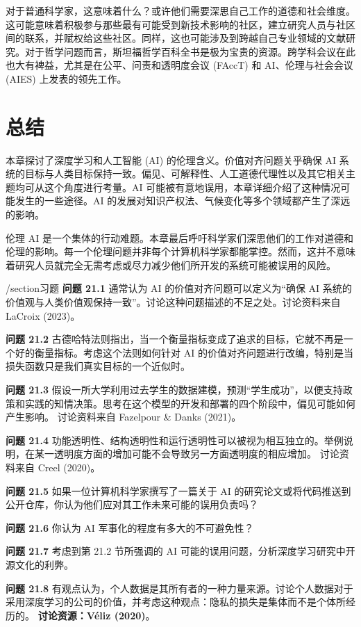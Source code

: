 对于普通科学家，这意味着什么？或许他们需要深思自己工作的道德和社会维度。这可能意味着积极参与那些最有可能受到新技术影响的社区，建立研究人员与社区间的联系，并赋权给这些社区。同样，这也可能涉及到跨越自己专业领域的文献研究。对于哲学问题而言，斯坦福哲学百科全书是极为宝贵的资源。跨学科会议在此也大有裨益，尤其是在公平、问责和透明度会议 (FAccT) 和 AI、伦理与社会会议 (AIES) 上发表的领先工作。

\section{总结}
本章探讨了深度学习和人工智能 (AI) 的伦理含义。价值对齐问题关乎确保 AI 系统的目标与人类目标保持一致。偏见、可解释性、人工道德代理性以及其它相关主题均可从这个角度进行考量。AI 可能被有意地误用，本章详细介绍了这种情况可能发生的一些途径。AI 的发展对知识产权法、气候变化等多个领域都产生了深远的影响。

伦理 AI 是一个集体的行动难题。本章最后呼吁科学家们深思他们的工作对道德和伦理的影响。每一个伦理问题并非每个计算机科学家都能掌控。然而，这并不意味着研究人员就完全无需考虑或尽力减少他们所开发的系统可能被误用的风险。

/section{习题}
\textbf{问题 21.1} 通常认为 AI 的价值对齐问题可以定义为“确保 AI 系统的价值观与人类价值观保持一致”。讨论这种问题描述的不足之处。讨论资料来自 LaCroix (2023)。

\textbf{问题 21.2} 古德哈特法则指出，当一个衡量指标变成了追求的目标，它就不再是一个好的衡量指标。考虑这个法则如何针对 AI 的价值对齐问题进行改编，特别是当损失函数只是我们真实目标的一个近似时。

\textbf{问题 21.3} 假设一所大学利用过去学生的数据建模，预测“学生成功”，以便支持政策和实践的知情决策。思考在这个模型的开发和部署的四个阶段中，偏见可能如何产生影响。 讨论资料来自 Fazelpour \& Danks (2021)。

\textbf{问题 21.4} 功能透明性、结构透明性和运行透明性可以被视为相互独立的。举例说明，在某一透明度方面的增加可能不会导致另一方面透明度的相应增加。 讨论资料来自 Creel (2020)。

\textbf{问题 21.5} 如果一位计算机科学家撰写了一篇关于 AI 的研究论文或将代码推送到公开仓库，你认为他们应对其工作未来可能的误用负责吗？

\textbf{问题 21.6} 你认为 AI 军事化的程度有多大的不可避免性？

\textbf{问题 21.7} 考虑到第 21.2 节所强调的 AI 可能的误用问题，分析深度学习研究中开源文化的利弊。

\textbf{问题 21.8} 有观点认为，个人数据是其所有者的一种力量来源。讨论个人数据对于采用深度学习的公司的价值，并考虑这种观点：隐私的损失是集体而不是个体所经历的。
\textbf{讨论资源：Véliz (2020)}。

